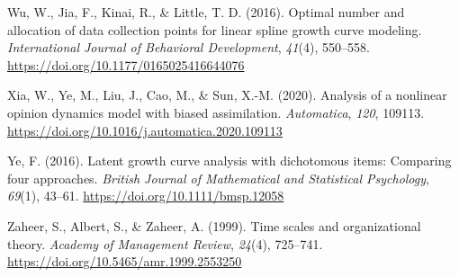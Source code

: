 \documentclass[
  english,
  man,floatsintext]{apa7}
\newlength{\cslhangindent}
\newlength{\cslentryspacingunit} %
\newenvironment{CSLReferences}[2] %
 {%
  \setlength{\parindent}{0pt}
  \ifodd #1
  \let\oldpar\par
  \def\par{\hangindent=\cslhangindent\oldpar}
  \fi
  \setlength{\parskip}{#2\cslentryspacingunit}
 }%
 {}
\begin{document}
\begin{CSLReferences}{1}{0}
\leavevmode{}%
Wu, W., Jia, F., Kinai, R., \& Little, T. D. (2016). Optimal number and allocation of data collection points for linear spline growth curve modeling. \emph{International Journal of Behavioral Development}, \emph{41}(4), 550--558. \url{https://doi.org/10.1177/0165025416644076}

\leavevmode{}%
Xia, W., Ye, M., Liu, J., Cao, M., \& Sun, X.-M. (2020). Analysis of a nonlinear opinion dynamics model with biased assimilation. \emph{Automatica}, \emph{120}, 109113. \url{https://doi.org/10.1016/j.automatica.2020.109113}

\leavevmode{}%
Ye, F. (2016). Latent growth curve analysis with dichotomous items: Comparing four approaches. \emph{British Journal of Mathematical and Statistical Psychology}, \emph{69}(1), 43--61. \url{https://doi.org/10.1111/bmsp.12058}

\leavevmode{}%
Zaheer, S., Albert, S., \& Zaheer, A. (1999). Time scales and organizational theory. \emph{Academy of Management Review}, \emph{24}(4), 725--741. \url{https://doi.org/10.5465/amr.1999.2553250}

\end{CSLReferences}
\end{document}
